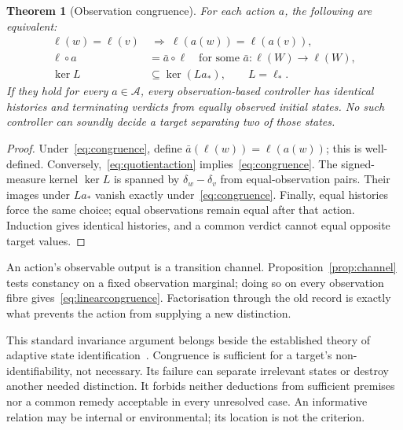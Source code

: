 \documentclass[11pt]{article}
\newtheorem{theorem}{Theorem}
\newcommand{\cA}{\mathcal A}
\begin{document}
\begin{theorem}[Observation congruence]\label{thm:congruence}
For each action $a$, the following are equivalent:
\begin{align}
\ell(w)=\ell(v)&\ \Longrightarrow\ \ell(a(w))=\ell(a(v)),\label{eq:congruence}\\
\ell\circ a&=\bar a\circ\ell\quad\text{for some }\bar a:\ell(W)\to\ell(W),\label{eq:quotientaction}\\
\ker L&\subseteq\ker(La_*),\qquad L=\ell_* .\label{eq:linearcongruence}
\end{align}
If they hold for every $a\in\cA$, every observation-based controller has identical histories and terminating verdicts from equally observed initial states. No such controller can soundly decide a target separating two of those states.
\end{theorem}
\begin{proof}
Under~\eqref{eq:congruence}, define $\bar a(\ell(w))=\ell(a(w))$; this is well-defined. Conversely,~\eqref{eq:quotientaction} implies~\eqref{eq:congruence}. The signed-measure kernel $\ker L$ is spanned by $\delta_w-\delta_v$ from equal-observation pairs. Their images under $La_*$ vanish exactly under~\eqref{eq:congruence}. Finally, equal histories force the same choice; equal observations remain equal after that action. Induction gives identical histories, and a common verdict cannot equal opposite target values.
\end{proof}
An action's observable output is a transition channel. Proposition~\ref{prop:channel} tests constancy on a fixed observation marginal; doing so on every observation fibre gives~\eqref{eq:linearcongruence}. Factorisation through the old record is exactly what prevents the action from supplying a new distinction.

This standard invariance argument belongs beside the established theory of adaptive state identification~\cite{bos}. Congruence is sufficient for a target's non-identifiability, not necessary. Its failure can separate irrelevant states or destroy another needed distinction. It forbids neither deductions from sufficient premises nor a common remedy acceptable in every unresolved case. An informative relation may be internal or environmental; its location is not the criterion.
\end{document}
